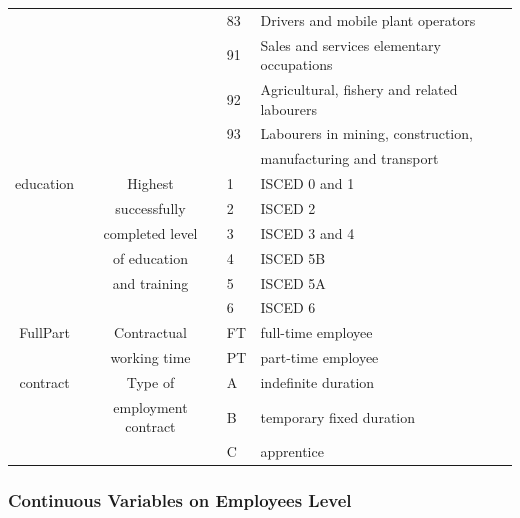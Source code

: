 \documentclass[12pt]{article}
\begin{document}
\begin{table}
\begin{center}
\begin{tabular}{|c|c|l l|}
&& 83 & Drivers and mobile plant operators \\
&& 91 & Sales and services elementary occupations \\
&& 92 & Agricultural, fishery and related labourers \\ 
&& 93 & Labourers in mining, construction, \\ 
&&& manufacturing and transport \\
\hline education & Highest  & 1 & ISCED 0 and 1 \\
& successfully  & 2 & ISCED 2  \\
& completed level  & 3 & ISCED 3 and 4  \\
& of education& 4& ISCED 5B \\
& and training  & 5 & ISCED 5A \\
& &  6 & ISCED 6  \\ %
\hline  FullPart & Contractual & FT & full-time employee \\
& working time & PT & part-time employee \\
\hline  contract & Type of & A & indefinite duration \\
& employment contract & B & temporary fixed duration \\ %
&& C & apprentice \\
\hline    
\end{tabular}
\end{center}
\label{tab:1}
\end{table}

\subsubsection{Continuous Variables on Employees Level}
\end{document}
